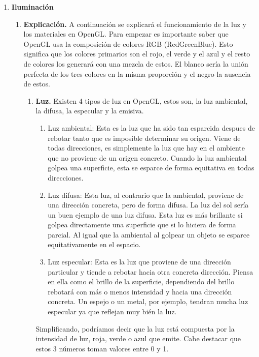 \documentclass[12pt,a4paper]{article}
\begin{document}
\begin{enumerate}
\begin{enumerate}
\item \textbf{Iluminación}
\begin{enumerate}
\item \textbf{Explicación.}
A continuación se explicará el funcionamiento de la luz y los materiales en OpenGL. Para empezar es importante saber que OpenGL usa la composición de colores RGB (RedGreenBlue). Esto significa que los colores primarios son el rojo, el verde y el azul y el resto de colores los generará con una mezcla de estos. El blanco sería la unión perfecta de los tres colores en la misma proporción y el negro la ausencia de estos.\newline
\begin{enumerate}
\item \textbf{Luz.}
Existen 4 tipos de luz en OpenGL, estos son, la luz ambiental, la difusa, la especular y la emisiva.
\begin{enumerate}
\item{Luz ambiental:}
Esta es la luz que ha sido tan esparcida despues de rebotar tanto que es imposible determinar su origen. Viene de todas direcciones, es simplemente la luz que hay en el ambiente que no proviene de un origen concreto.\newline
Cuando la luz ambiental golpea una superficie, esta se esparce de forma equitativa en todas direcciones.
\item{Luz difusa:}
Esta luz, al contrario que la ambiental, proviene de una dirección concreta, pero de forma difusa. La luz del sol sería un buen ejemplo de una luz difusa.\newline
Esta luz es más brillante si golpea directamente una superficie que si lo hiciera de forma parcial. Al igual que la ambiental al golpear un objeto se esparce equitativamente en el espacio.
\item{Luz especular:}
Esta es la luz que proviene de una dirección particular y tiende a rebotar hacia otra concreta dirección. Piensa en ella como el brillo de la superficie, dependiendo del brillo rebotará con más o menos intensidad y hacia una dirección concreta. Un espejo o un metal, por ejemplo, tendran mucha luz especular ya que reflejan muy bién la luz.
\end{enumerate}
Simplificando, podríamos decir que la luz está compuesta por la intensidad de luz, roja, verde o azul que emite. Cabe destacar que estos 3 números toman valores entre 0 y 1.


\end{enumerate}
\end{enumerate}
\end{enumerate}
\end{enumerate}
\end{document}
